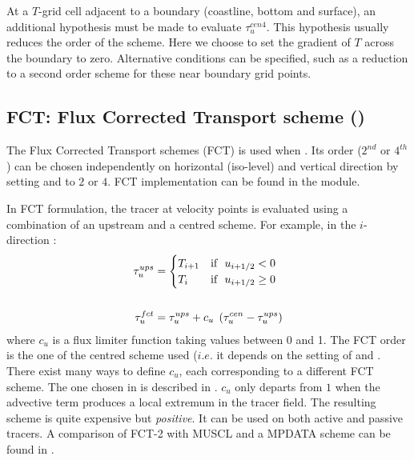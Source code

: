 \documentclass[../tex_main/NEMO_manual]{subfiles}
\begin{document}
At a $T$-grid cell adjacent to a boundary (coastline, bottom and surface), 
an additional hypothesis must be made to evaluate $\tau _u^{cen4}$. 
This hypothesis usually reduces the order of the scheme. 
Here we choose to set the gradient of $T$ across the boundary to zero. 
Alternative conditions can be specified, such as a reduction to a second order scheme 
for these near boundary grid points.

\subsection{FCT: Flux Corrected Transport scheme (\protect{})}
\label{subsec:TRA_adv_tvd}

The Flux Corrected Transport schemes (FCT) is used when . 
Its order ($2^{nd}$ or $4^{th}$) can be chosen independently on horizontal (iso-level) 
and vertical direction by setting  and  to $2$ or $4$.
FCT implementation can be found in the  module.

In FCT formulation, the tracer at velocity points is evaluated using a combination of 
an upstream and a centred scheme. For example, in the $i$-direction :
\begin{equation} \label{eq:tra_adv_fct}
\begin{split}
\tau _u^{ups}&= \begin{cases}
 					T_{i+1} 	& \text{if $\ u_{i+1/2} <     0$} \hfill \\
 					T_i   		& \text{if $\ u_{i+1/2} \geq 0$} \hfill \\
				  \end{cases}     \\
\\
\tau _u^{fct}&=\tau _u^{ups} +c_u \;\left( {\tau _u^{cen} -\tau _u^{ups} } \right)
\end{split}
\end{equation}
where $c_u$ is a flux limiter function taking values between 0 and 1. 
The FCT order is the one of the centred scheme used ($i.e.$ it depends on the setting of
 and .
There exist many ways to define $c_u$, each corresponding to a different 
FCT scheme. The one chosen in \NEMO is described in \citet{Zalesak_JCP79}. 
$c_u$ only departs from $1$ when the advective term produces a local extremum in the tracer field. 
The resulting scheme is quite expensive but \emph{positive}. 
It can be used on both active and passive tracers. 
A comparison of FCT-2 with MUSCL and a MPDATA scheme can be found in \citet{Levy_al_GRL01}. 
\end{document}

